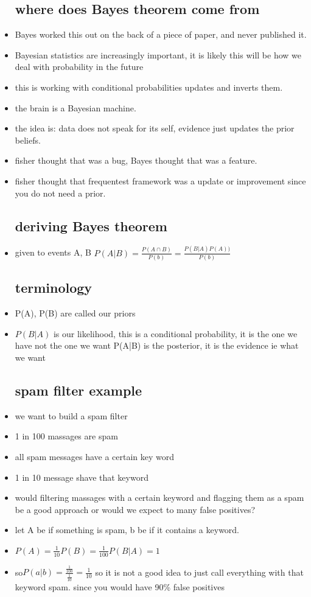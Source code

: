 \documentclass{article}
\begin{document}
\begin{itemize}
\subsection{where does Bayes theorem come from }
\item Bayes worked this out on the back of a piece of paper, and never published it. 
\item Bayesian statistics are increasingly important, it is likely this will be how we deal with probability in the future 
\item this is working with conditional probabilities updates and inverts them.
\item the brain is a Bayesian machine. 
\item the idea is: data does not speak for its self, evidence just updates the prior beliefs. 
\item fisher thought that was a bug, Bayes thought that was a feature.
\item fisher thought that frequentest framework was a update or improvement since you do not need a prior. 
\subsection{deriving Bayes theorem }
\item given to events A, B $P(A|B)=\frac{P(A\cap B)}{P(b)}=\frac{P(B|A)P(A))}{P(b)}$
\subsection{terminology}
\item P(A), P(B) are called our priors
\item $P(B|A)$ is our likelihood, this is a conditional probability, it is the one we have not the one we want 
\itme P(A|B) is the posterior, it is the evidence ie what we want 
\subsection{spam filter example}
\item we want to build a spam filter 
\item 1 in 100 massages are spam 
\item all spam messages have a certain key word 
\item 1 in 10 message shave that keyword 
\item would filtering massages with  a certain keyword and flagging them as a spam be a good approach or would we expect to many false positives? 
\item let A be if something is spam, b be if it contains a keyword. 
\item$ P(A)=\frac{1}{10} P(B)=\frac{1}{100} P(B|A)=1$
\item so$ P(a|b)=\frac{\frac{1}{100}}{\frac{1}{10}}=\frac{1}{10}$ so it is not a good idea to just call everything with that keyword spam. since you would have 90\% false positives

\end{itemize}
\end{document}
